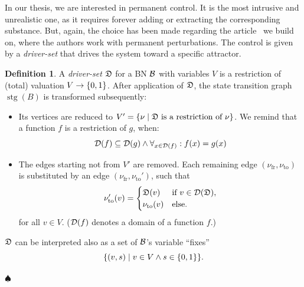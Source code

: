 \documentclass[
	digital, oneside, nosansbold, nocolorbold, nolot, nolof
]{fithesis4}
\theoremstyle{definition}
\newtheorem{definition}{Definition}
\theoremstyle{definition}
\newenvironment{ldefinition}
    {\begin{definition}}
	{\par\hspace{\stretch{1}}$\spadesuit$\hspace{\stretch{1}}
     \par\end{definition}}
\DeclareMathOperator{\stg}{stg}
\DeclarePairedDelimiter{\set}{\{}{\}}
\begin{document}
In our thesis, we are interested in permanent control. It is the most intrusive
and unrealistic one, as it requires forever adding or extracting the
corresponding substance. But, again, the choice has been made regarding the
article~\cite{infl_max_BN} we build on, where the authors work with permanent
perturbations. The control is given by a \emph{driver-set} that drives the
system toward a specific attractor.

\begin{ldefinition}
A \emph{driver-set} $\mathfrak{D}$ for a BN $\mathcal{B}$ with variables $V$ is a
restriction of (total) valuation $V \to \set{0, 1}$. After application of
$\mathfrak{D}$, the state transition graph $\stg(B)$ is transformed subsequently:
\begin{itemize}
    \item Its vertices are reduced to $V' = \set{\nu \mid \dset{D} \text{ is
        a restriction of } \nu}$. We remind that a function $f$ is a
        restriction of $g$, when:
        \[
        \mathcal{D}(f) \subseteq \mathcal{D}(g) \land \forall_{x \in \mathcal{D}(f)} : f(x) = g(x)
        \]
    \item The edges starting not from $V'$ are removed.
        Each remaining edge $(\nu_{\text{fr}}, \nu_{\text{to}})$ is
        substituted by an edge $(\nu_{\text{fr}}, \nu_{\text{to}}')$,
        such that
        \[
            \nu_{\text{to}}'(v) =
            \begin{cases}
                \mathfrak{D}(v) & \text{if } v \in \mathcal{D}(\mathfrak{D}),\\
                \nu_{\text{to}}(v) & \text{else}.
            \end{cases}
        \]
        for all $v \in V$. ($\mathcal{D}(f)$ denotes a domain of a function $f$.)
\end{itemize}

$\mathfrak{D}$ can be interpreted also as a set of $\mathcal{B}$'s variable
\enquote{fixes}
\[
    \set*{(v, s) \mid v \in V \land s \in \set{0, 1}}.
\]
\end{ldefinition}
\end{document}
